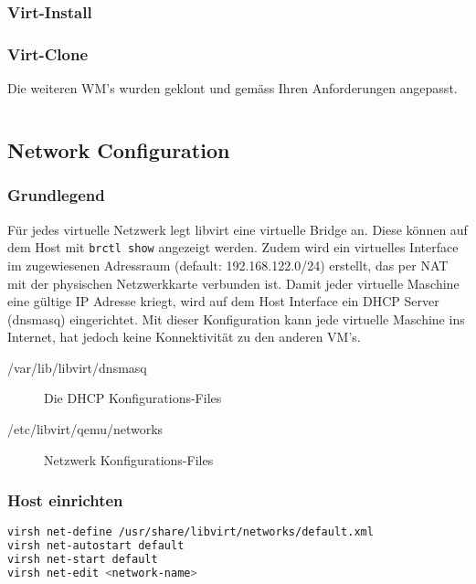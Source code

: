 \subsubsection{Virt-Install}

\subsubsection{Virt-Clone}
Die weiteren WM's wurden geklont und gemäss Ihren Anforderungen angepasst.
\begin{lstlisting}[language=bash]

\end{lstlisting}


\subsection{Network Configuration}


\subsubsection{Grundlegend}
Für jedes virtuelle Netzwerk legt libvirt eine virtuelle Bridge an. Diese können auf dem Host mit \lstinline|brctl show| angezeigt werden. Zudem wird ein virtuelles Interface im zugewiesenen Adressraum (default: 192.168.122.0/24) erstellt, das per NAT mit der physischen Netzwerkkarte verbunden ist. Damit jeder virtuelle Maschine eine gültige IP Adresse kriegt, wird auf dem Host Interface ein DHCP Server (dnsmasq) eingerichtet. Mit dieser Konfiguration kann jede virtuelle Maschine ins Internet, hat jedoch keine Konnektivität zu den anderen VM's. 

\begin{description}
	\item[/var/lib/libvirt/dnsmasq] Die DHCP Konfigurations-Files 
	\item[/etc/libvirt/qemu/networks] Netzwerk Konfigurations-Files
\end{description}




\subsubsection{Host einrichten}
\begin{lstlisting}[language=bash]
virsh net-define /usr/share/libvirt/networks/default.xml
virsh net-autostart default
virsh net-start default
virsh net-edit <network-name>
\end{lstlisting}


